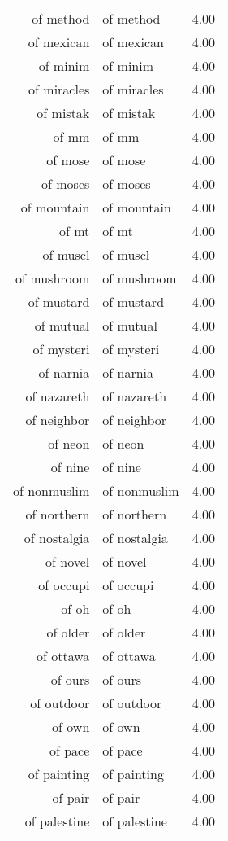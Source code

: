 \begin{table}[ht]
\begin{tabular}{rlr}
  of method & of method & 4.00 \\ 
  of mexican & of mexican & 4.00 \\ 
  of minim & of minim & 4.00 \\ 
  of miracles & of miracles & 4.00 \\ 
  of mistak & of mistak & 4.00 \\ 
  of mm & of mm & 4.00 \\ 
  of mose & of mose & 4.00 \\ 
  of moses & of moses & 4.00 \\ 
  of mountain & of mountain & 4.00 \\ 
  of mt & of mt & 4.00 \\ 
  of muscl & of muscl & 4.00 \\ 
  of mushroom & of mushroom & 4.00 \\ 
  of mustard & of mustard & 4.00 \\ 
  of mutual & of mutual & 4.00 \\ 
  of mysteri & of mysteri & 4.00 \\ 
  of narnia & of narnia & 4.00 \\ 
  of nazareth & of nazareth & 4.00 \\ 
  of neighbor & of neighbor & 4.00 \\ 
  of neon & of neon & 4.00 \\ 
  of nine & of nine & 4.00 \\ 
  of nonmuslim & of nonmuslim & 4.00 \\ 
  of northern & of northern & 4.00 \\ 
  of nostalgia & of nostalgia & 4.00 \\ 
  of novel & of novel & 4.00 \\ 
  of occupi & of occupi & 4.00 \\ 
  of oh & of oh & 4.00 \\ 
  of older & of older & 4.00 \\ 
  of ottawa & of ottawa & 4.00 \\ 
  of ours & of ours & 4.00 \\ 
  of outdoor & of outdoor & 4.00 \\ 
  of own & of own & 4.00 \\ 
  of pace & of pace & 4.00 \\ 
  of painting & of painting & 4.00 \\ 
  of pair & of pair & 4.00 \\ 
  of palestine & of palestine & 4.00 \\ 

\end{tabular}
\end{table}

